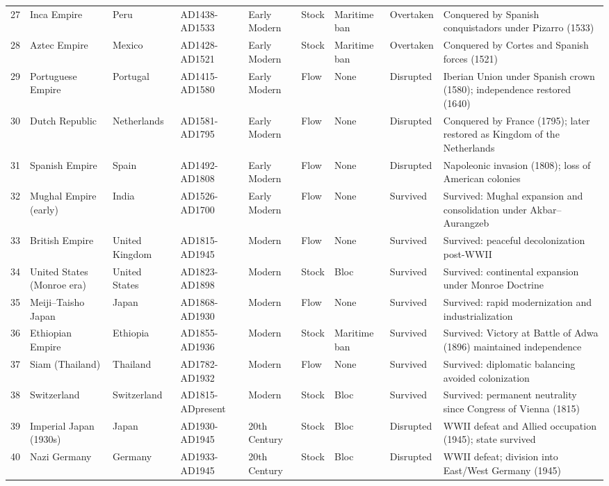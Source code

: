 \documentclass[11pt]{article}
\begin{document}
\begin{longtable}{@{}r l l l l l l l p{5.5cm}@{}}
27 & Inca Empire & Peru & AD1438-AD1533 & Early Modern & Stock & Maritime ban & Overtaken & Conquered by Spanish conquistadors under Pizarro (1533) \\
28 & Aztec Empire & Mexico & AD1428-AD1521 & Early Modern & Stock & Maritime ban & Overtaken & Conquered by Cortes and Spanish forces (1521) \\
29 & Portuguese Empire & Portugal & AD1415-AD1580 & Early Modern & Flow & None & Disrupted & Iberian Union under Spanish crown (1580); independence restored (1640) \\
30 & Dutch Republic & Netherlands & AD1581-AD1795 & Early Modern & Flow & None & Disrupted & Conquered by France (1795); later restored as Kingdom of the Netherlands \\
31 & Spanish Empire & Spain & AD1492-AD1808 & Early Modern & Flow & None & Disrupted & Napoleonic invasion (1808); loss of American colonies \\
32 & Mughal Empire (early) & India & AD1526-AD1700 & Early Modern & Flow & None & Survived & Survived: Mughal expansion and consolidation under Akbar--Aurangzeb \\
33 & British Empire & United Kingdom & AD1815-AD1945 & Modern & Flow & None & Survived & Survived: peaceful decolonization post-WWII \\
34 & United States (Monroe era) & United States & AD1823-AD1898 & Modern & Stock & Bloc & Survived & Survived: continental expansion under Monroe Doctrine \\
35 & Meiji--Taisho Japan & Japan & AD1868-AD1930 & Modern & Flow & None & Survived & Survived: rapid modernization and industrialization \\
36 & Ethiopian Empire & Ethiopia & AD1855-AD1936 & Modern & Stock & Maritime ban & Survived & Survived: Victory at Battle of Adwa (1896) maintained independence \\
37 & Siam (Thailand) & Thailand & AD1782-AD1932 & Modern & Flow & None & Survived & Survived: diplomatic balancing avoided colonization \\
38 & Switzerland & Switzerland & AD1815-ADpresent & Modern & Stock & Bloc & Survived & Survived: permanent neutrality since Congress of Vienna (1815) \\
39 & Imperial Japan (1930s) & Japan & AD1930-AD1945 & 20th Century & Stock & Bloc & Disrupted & WWII defeat and Allied occupation (1945); state survived \\
40 & Nazi Germany & Germany & AD1933-AD1945 & 20th Century & Stock & Bloc & Disrupted & WWII defeat; division into East/West Germany (1945) \\

\end{longtable}
\end{document}
